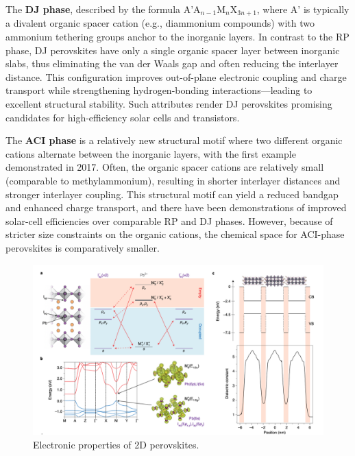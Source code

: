 The \textbf{DJ phase}, described by the formula A’A$_{n-1}$M$_n$X$_{3n+1}$, where A’ is typically a divalent organic spacer cation (e.g., diammonium compounds) with two ammonium tethering groups anchor to the inorganic layers. In contrast to the RP phase, DJ perovskites have only a single organic spacer layer between inorganic slabs, thus eliminating the van der Waals gap and often reducing the interlayer distance\cite{RN106}. This configuration improves out-of-plane electronic coupling and charge transport while strengthening hydrogen-bonding interactions—leading to excellent structural stability. Such attributes render DJ perovskites promising candidates for high-efficiency solar cells and transistors\cite{RN198}. 

The \textbf{ACI phase} is a relatively new structural motif where two different organic cations alternate between the inorganic layers, with the first example demonstrated in 2017\cite{RN214}. Often, the organic spacer cations are relatively small (comparable to methylammonium), resulting in shorter interlayer distances and stronger interlayer coupling\cite{RN242}. This structural motif can yield a reduced bandgap and enhanced charge transport, and there have been demonstrations of improved solar-cell efficiencies over comparable RP and DJ phases\cite{RN212,RN208}. However, because of stricter size constraints on the organic cations, the chemical space for ACI-phase perovskites is comparatively smaller.


\begin{figure}[ht]
    \centering
    \includegraphics[width=\textwidth]{figures/literature-review/figure2-11.png}
    \caption{Electronic properties of 2D perovskites\cite{RN119}.}
    \label{fig:figure2.11}
\end{figure}

